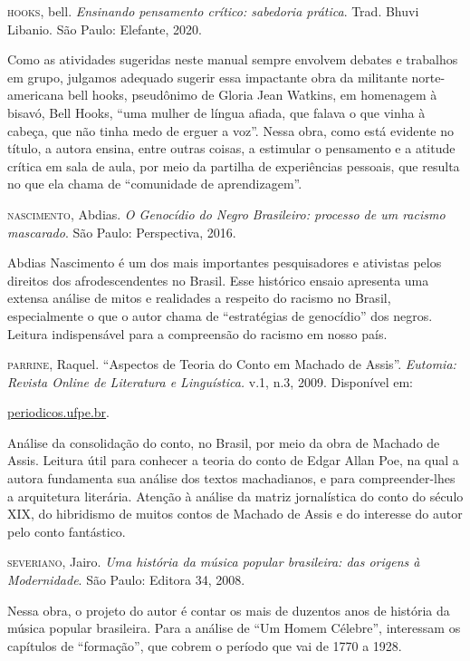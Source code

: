 \documentclass[11pt]{extarticle}
\begin{document}
\textsc{hooks}, bell. \textit{Ensinando pensamento crítico: sabedoria prática}.
Trad. Bhuvi Libanio. São Paulo: Elefante, 2020.

Como as atividades sugeridas neste manual sempre envolvem debates e
trabalhos em grupo, julgamos adequado sugerir essa impactante obra da
militante norte-americana bell hooks, pseudônimo de Gloria Jean Watkins,
em homenagem à bisavó, Bell Hooks, ``uma mulher de língua afiada, que
falava o que vinha à cabeça, que não tinha medo de erguer a voz''. Nessa
obra, como está evidente no título, a autora ensina, entre outras
coisas, a estimular o pensamento e a atitude crítica em sala de aula,
por meio da partilha de experiências pessoais, que resulta no que ela
chama de ``comunidade de aprendizagem''.

\textsc{nascimento}, Abdias. \textit{O Genocídio do Negro Brasileiro: processo de
um racismo mascarado}. São Paulo: Perspectiva, 2016.

Abdias Nascimento é um dos mais importantes pesquisadores e ativistas
pelos direitos dos afrodescendentes no Brasil. Esse histórico ensaio
apresenta uma extensa análise de mitos e realidades a respeito do
racismo no Brasil, especialmente o que o autor chama de ``estratégias de
genocídio'' dos negros. Leitura indispensável para a compreensão do
racismo em nosso país.

\textsc{parrine}, Raquel. ``Aspectos de Teoria do Conto em Machado de Assis''.
\textit{Eutomia: Revista Online de Literatura e Linguística.} v.1, n.3,
2009. Disponível em:

\href{https://periodicos.ufpe.br/revistas/EUTOMIA/article/view/1902/1489}{periodicos.ufpe.br}.

Análise da consolidação do conto, no Brasil, por meio da obra de Machado
de Assis. Leitura útil para conhecer a teoria do conto de Edgar Allan
Poe, na qual a autora fundamenta sua análise dos textos machadianos, e
para compreender-lhes a arquitetura literária. Atenção à análise da
matriz jornalística do conto do século XIX, do hibridismo de muitos
contos de Machado de Assis e do interesse do autor pelo conto
fantástico.

\textsc{severiano}, Jairo. \textit{Uma história da música popular brasileira: das
origens à Modernidade}. São Paulo: Editora 34, 2008.

Nessa obra, o projeto do autor é contar os mais de duzentos anos de
história da música popular brasileira. Para a análise de ``Um Homem
Célebre'', interessam os capítulos de ``formação'', que cobrem o período
que vai de 1770 a 1928.
\end{document}
